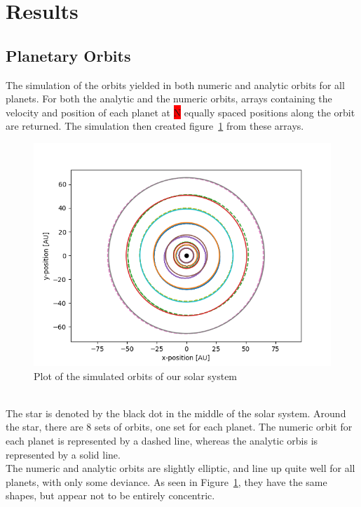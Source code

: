 \documentclass[reprint,english,notitlepage]{revtex4-2}
\begin{document}
\section{Results}
\subsection{Planetary Orbits}
    The simulation of the orbits yielded in both numeric and analytic orbits for all planets.
	For both the analytic and the numeric orbits, arrays containing the velocity and position of each planet at \colorbox{red}{N} equally spaced positions along the orbit are returned.
	The simulation then created figure~\ref{fig:Orbit_Plot} from these arrays.
\begin{figure}[h]
	\centering
	\includegraphics[scale=0.4]{Figures/Orbit_plots}
	\caption{Plot of the simulated orbits of our solar system}\label{fig:Orbit_Plot}
\end{figure}\\
	The star is denoted by the black dot in the middle of the solar system.
	Around the star, there are 8 sets of orbits, one set for each planet.
	The numeric orbit for each planet is represented by a dashed line, whereas the analytic orbis is represented by a solid line.\\
	The numeric and analytic orbits are slightly elliptic, and line up quite well for all planets, with only some deviance.
	As seen in Figure~\ref{fig:Orbit_Plot}, they have the same shapes, but appear not to be entirely concentric.
\end{document}
